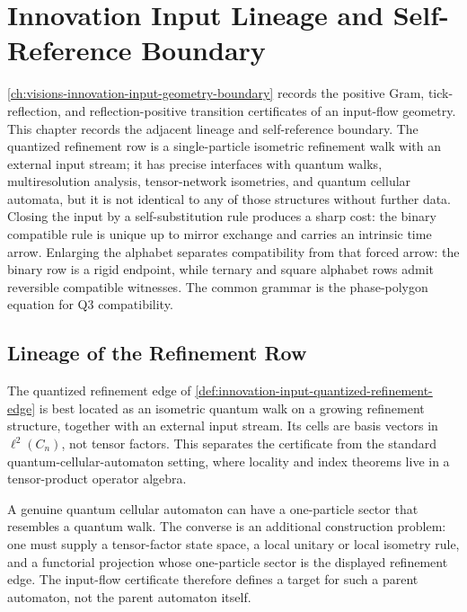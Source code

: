 \chapter{Innovation Input Lineage and Self-Reference Boundary}
\label{ch:visions-innovation-input-lineage-self-reference-boundary}

\autoref{ch:visions-innovation-input-geometry-boundary} records the
positive Gram, tick-reflection, and reflection-positive transition
certificates of an input-flow geometry. This chapter records the adjacent
lineage and self-reference boundary. The quantized refinement row is a
single-particle isometric refinement walk with an external input stream; it
has precise interfaces with quantum walks, multiresolution analysis,
tensor-network isometries, and quantum cellular automata, but it is not
identical to any of those structures without further data. Closing the
input by a self-substitution rule produces a sharp cost: the binary
compatible rule is unique up to mirror exchange and carries an intrinsic
time arrow. Enlarging the alphabet separates compatibility from that
forced arrow: the binary row is a rigid endpoint, while ternary and square
alphabet rows admit reversible compatible witnesses. The common grammar is
the phase-polygon equation for Q3 compatibility.

\section{Lineage of the Refinement Row}
\label{sec:innovation-input-lineage-refinement-row}

\begin{principle}
\label{prin:innovation-input-single-particle-refinement-walk}
The quantized refinement edge of
\autoref{def:innovation-input-quantized-refinement-edge} is best located
as an isometric quantum walk on a growing refinement structure, together
with an external input stream. Its cells are basis vectors in
$\ell^2(C_n)$, not tensor factors. This separates the certificate from the
standard quantum-cellular-automaton setting, where locality and index
theorems live in a tensor-product operator algebra.
\end{principle}

\begin{principle}
\label{prin:innovation-input-qca-boundary}
A genuine quantum cellular automaton can have a one-particle sector that
resembles a quantum walk. The converse is an additional construction
problem: one must supply a tensor-factor state space, a local unitary or
local isometry rule, and a functorial projection whose one-particle sector
is the displayed refinement edge. The input-flow certificate therefore
defines a target for such a parent automaton, not the parent automaton
itself.
\end{principle}

